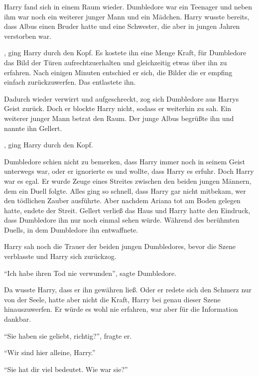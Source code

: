 Harry fand sich in einem Raum wieder. Dumbledore war ein Teenager und neben ihm war noch ein weiterer junger Mann und ein Mädchen. Harry wusste bereits, dass Albus einen Bruder hatte und eine Schwester, die aber in jungen Jahren verstorben war.

, ging Harry durch den Kopf. Es kostete ihn eine Menge Kraft, für Dumbledore das Bild der Türen aufrechtzuerhalten und gleichzeitig etwas über ihn zu erfahren. Nach einigen Minuten entschied er sich, die Bilder die er empfing einfach zurückzuwerfen. Das entlastete ihn.

Dadurch wieder verwirrt und aufgeschreckt, zog sich Dumbledore aus Harrys Geist zurück. Doch er blockte Harry nicht, sodass er weiterhin zu sah. Ein weiterer junger Mann betrat den Raum. Der junge Albus begrüßte ihn und nannte ihn Gellert.

, ging Harry durch den Kopf.

Dumbledore schien nicht zu bemerken, dass Harry immer noch in seinem Geist unterwegs war, oder er ignorierte es und wollte, dass Harry es erfuhr. Doch Harry war es egal. Er wurde Zeuge eines Streites zwischen den beiden jungen Männern, dem ein Duell folgte. Alles ging so schnell, dass Harry gar nicht mitbekam, wer den tödlichen Zauber ausführte. Aber nachdem Ariana tot am Boden gelegen hatte, endete der Streit. Gellert verließ das Haus und Harry hatte den Eindruck, dass Dumbledore ihn nur noch einmal sehen würde. Während des berühmten Duells, in dem Dumbledore ihn entwaffnete.

Harry sah noch die Trauer der beiden jungen Dumbledores, bevor die Szene verblasste und Harry sich zurückzog.

\enquote{Ich habe ihren Tod nie verwunden}, sagte Dumbledore.

Da wusste Harry, dass er ihn gewähren ließ. Oder er redete sich den Schmerz nur von der Seele, hatte aber nicht die Kraft, Harry bei genau dieser Szene hinauszuwerfen. Er würde es wohl nie erfahren, war aber für die Information dankbar.

\enquote{Sie haben sie geliebt, richtig?}, fragte er.

\enquote{Wir sind hier alleine, Harry.}

\enquote{Sie hat dir viel bedeutet. Wie war sie?}

